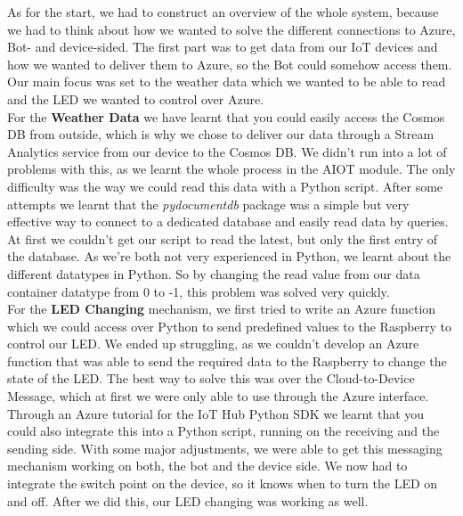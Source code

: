 \documentclass[a4paper]{article}
\begin{document}
		As for the start, we had to construct an overview of the whole system, because we had to think about how we wanted to solve the different connections to Azure, Bot- and device-sided.
		The first part was to get data from our IoT devices and how we wanted to deliver them to Azure, so the Bot could somehow access them.
		Our main focus was set to the weather data which we wanted to be able to read and the LED we wanted to control over Azure. \\
		
		For the \textbf{Weather Data} we have learnt that you could easily access the Cosmos DB from outside, which is why we chose to deliver our data through a Stream Analytics service from our device to the Cosmos DB. 
		We didn't run into a lot of problems with this, as we learnt the whole process in the AIOT module.
		The only difficulty was the way we could read this data with a Python script. 
		After some attempts we learnt that the \textit{pydocumentdb} package was a simple but very effective way to connect to a dedicated database and easily read data by queries. At first we couldn't get our script to read the latest, but only the first entry of the database. 
		As we're both not very experienced in Python, we learnt about the different datatypes in Python.
		So by changing the read value from our data container datatype from 0 to -1, this problem was solved very quickly. \\
		
		For the \textbf{LED Changing} mechanism, we first tried to write an Azure function which we could access over Python to send predefined values to the Raspberry to control our LED.
	 	We ended up struggling, as we couldn't develop an Azure function that was able to send the required data to the Raspberry to change the state of the LED.
	 	The best way to solve this was over the Cloud-to-Device Message, which at first we were only able to use through the Azure interface.
	 	Through an Azure tutorial for the IoT Hub Python SDK we learnt that you could also integrate this into a Python script, running on the receiving and the sending side.
	 	With some major adjustments, we were able to get this messaging mechanism working on both, the bot and the device side.
	 	We now had to integrate the switch point on the device, so it knows when to turn the LED on and off.
	 	After we did this, our LED changing was working as well. \\
	 	
\end{document}
